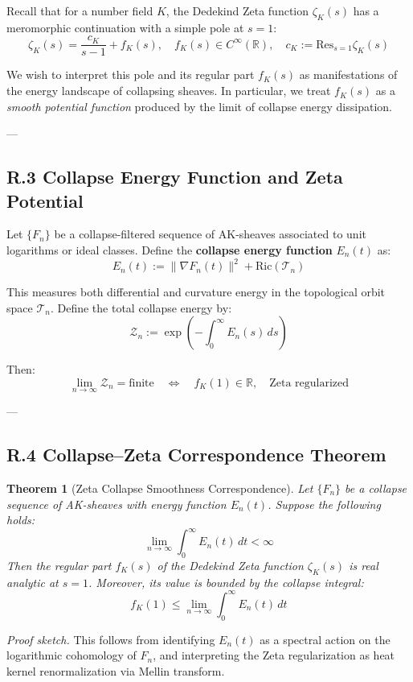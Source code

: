 \documentclass[11pt]{article}
\newtheorem{theorem}{Theorem}[section]
\begin{document}
\begin{axiom}
\begin{axiom}
{{Recall that for a number field $K$, the Dedekind Zeta function $\zeta_K(s)$ has a meromorphic continuation with a simple pole at $s = 1$:
\[
\zeta_K(s) = \frac{c_K}{s - 1} + f_K(s), \quad f_K(s) \in C^\infty(\mathbb{R}), \quad c_K := \mathrm{Res}_{s=1} \zeta_K(s)
\]

We wish to interpret this pole and its regular part $f_K(s)$ as manifestations of the energy landscape of collapsing sheaves.  
In particular, we treat $f_K(s)$ as a \emph{smooth potential function} produced by the limit of collapse energy dissipation.

---

\subsection*{R.3 Collapse Energy Function and Zeta Potential}

Let $\{F_n\}$ be a collapse-filtered sequence of AK-sheaves associated to unit logarithms or ideal classes.  
Define the \textbf{collapse energy function} $E_n(t)$ as:
\[
E_n(t) := \| \nabla F_n(t) \|^2 + \mathrm{Ric}(\mathcal{T}_n)
\]

This measures both differential and curvature energy in the topological orbit space $\mathcal{T}_n$.  
Define the total collapse energy by:
\[
\mathcal{Z}_n := \exp\left( -\int_0^\infty E_n(s)\, ds \right)
\]

Then:
\[
\lim_{n \to \infty} \mathcal{Z}_n = \text{finite} \quad \Longleftrightarrow \quad f_K(1) \in \mathbb{R}, \quad \text{Zeta regularized}
\]

---

\subsection*{R.4 Collapse–Zeta Correspondence Theorem}

\begin{theorem}[Zeta Collapse Smoothness Correspondence]
Let $\{F_n\}$ be a collapse sequence of AK-sheaves with energy function $E_n(t)$.  
Suppose the following holds:
\[
\lim_{n \to \infty} \int_0^\infty E_n(t)\, dt < \infty
\]
Then the regular part $f_K(s)$ of the Dedekind Zeta function $\zeta_K(s)$ is real analytic at $s = 1$.  
Moreover, its value is bounded by the collapse integral:
\[
f_K(1) \leq \lim_{n \to \infty} \int_0^\infty E_n(t)\, dt
\]
\end{theorem}

\textit{Proof sketch.} This follows from identifying $E_n(t)$ as a spectral action on the logarithmic cohomology of $F_n$, and interpreting the Zeta regularization as heat kernel renormalization via Mellin transform.

}}
\end{axiom}
\end{axiom}
\end{document}
